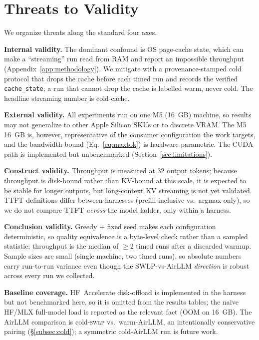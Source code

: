 \documentclass[10pt,a4paper]{article}
\newcommand{\swlp}{\textsc{swlp}}
\begin{document}
\section{Threats to Validity}
\label{sec:threats}

We organize threats along the standard four axes.

\textbf{Internal validity.} The dominant confound is OS page-cache state, which can
make a ``streaming'' run read from RAM and report an impossible throughput
(Appendix~\ref{app:methodology}). We mitigate with a provenance-stamped cold
protocol that drops the cache before each timed run and records the verified
\texttt{cache\_state}; a run that cannot drop the cache is labelled warm, never
cold. The headline streaming number is cold-cache.

\textbf{External validity.} All experiments run on one M5 (16~GB) machine, so
results may not generalize to other Apple Silicon SKUs or to discrete VRAM. The
M5 16~GB is, however, representative of the consumer configuration the work
targets, and the bandwidth bound (Eq.~\ref{eq:maxtok}) is hardware-parametric. The
CUDA path is implemented but unbenchmarked (Section~\ref{sec:limitations}).

\textbf{Construct validity.} Throughput is measured at 32 output tokens; because
throughput is disk-bound rather than KV-bound at this scale, it is expected to be
stable for longer outputs, but long-context KV streaming is not yet validated.
TTFT definitions differ between harnesses (prefill-inclusive vs.\ argmax-only), so
we do not compare TTFT \emph{across} the model ladder, only within a harness.

\textbf{Conclusion validity.} Greedy + fixed seed makes each configuration
deterministic, so quality equivalence is a byte-level check rather than a sampled
statistic; throughput is the median of $\ge$2 timed runs after a discarded warmup.
Sample sizes are small (single machine, two timed runs), so absolute numbers carry
run-to-run variance even though the SWLP-vs-AirLLM \emph{direction} is robust
across every run we collected.

\textbf{Baseline coverage.} HF~Accelerate disk-offload is implemented in the
harness but not benchmarked here, so it is omitted from the results tables; the
naive HF/MLX full-model load is reported as the relevant fact (OOM on 16~GB).
The AirLLM comparison is cold-\swlp{} vs.\ warm-AirLLM, an intentionally
conservative pairing (\S\ref{subsec:cold}); a symmetric cold-AirLLM run is future
work.
\end{document}
